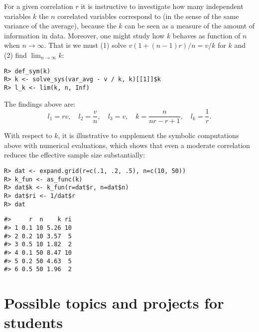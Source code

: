 For a given correlation \(r\) it is instructive to investigate how many
independent variables \(k\) the \(n\) correlated variables correspond to
(in the sense of the same variance of the average), because the \(k\)
can be seen as a measure of the amount of information in data.
Moreover, one might study how \(k\) behaves as function of \(n\)
when \(n \rightarrow \infty\).
That is we must (1) solve \(v (1 + (n-1)r)/n = v/k\) for \(k\)
and (2) find \(\lim_{n\rightarrow\infty} k\):

\begin{verbatim}
R> def_sym(k)
R> k <- solve_sys(var_avg - v / k, k)[[1]]$k
R> l_k <- lim(k, n, Inf)
\end{verbatim}

The findings above are:
\[
l_1 = r v, \quad
l_2 = \frac{v}{n}, \quad
l_3 = v, \quad
k = \frac{n}{n r - r + 1}, \quad 
l_k = \frac{1}{r} .
\]

With respect to \(k\), it is illustrative to supplement the symbolic
computations above with numerical evaluations, which shows that
even a moderate correlation reduces the effective sample size substantially:

\begin{verbatim}
R> dat <- expand.grid(r=c(.1, .2, .5), n=c(10, 50))
R> k_fun <- as_func(k)
R> dat$k <- k_fun(r=dat$r, n=dat$n)
R> dat$ri <- 1/dat$r
R> dat
\end{verbatim}

\begin{verbatim}
#>     r  n    k ri
#> 1 0.1 10 5.26 10
#> 2 0.2 10 3.57  5
#> 3 0.5 10 1.82  2
#> 4 0.1 50 8.47 10
#> 5 0.2 50 4.63  5
#> 6 0.5 50 1.96  2
\end{verbatim}

\hypertarget{possible-topics-and-projects-for-students}{%
\section{Possible topics and projects for students}\label{possible-topics-and-projects-for-students}}

